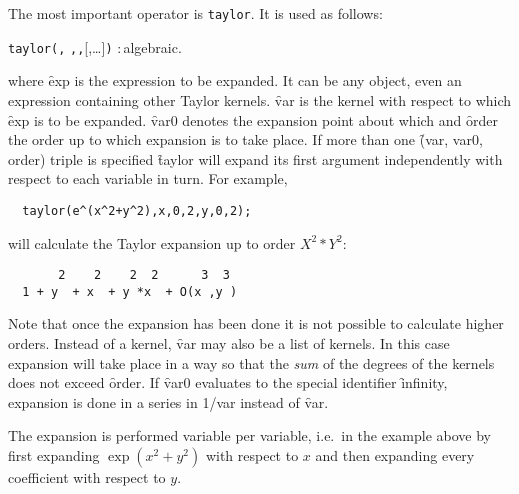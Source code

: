 

The most important operator is \texttt{taylor}.
It is used as follows:
\hypertarget{operator:TAYLOR}{}
\begin{syntax}
  \texttt{taylor(}\texttt{,}\newline
         \texttt{,}\texttt{,}[,\ldots]\texttt{)}
         :\,algebraic.
\end{syntax}
where \f{exp} is the expression to be expanded. It can be any \REDUCE{}
object, even an expression containing other Taylor kernels. \f{var} is
the kernel with respect to which \f{exp} is to be expanded. \f{var0}
denotes the expansion point about which and \f{order} the order up to which
expansion is to take place. If more than one \f{(var, var0, order)} triple
is specified \f{taylor} will expand its first argument independently
with respect to each variable in turn. For example,
\begin{verbatim}
  taylor(e^(x^2+y^2),x,0,2,y,0,2);
\end{verbatim}
will calculate the Taylor expansion up to order $X^{2}*Y^{2}$:
\begin{verbatim}
       2    2    2  2      3  3
  1 + y  + x  + y *x  + O(x ,y )
\end{verbatim}
Note that once the expansion has been done it is not possible to
calculate higher orders.
Instead of a kernel, \f{var} may also
be a list of kernels. In this case expansion will take place in a way
so that the \emph{sum} of the degrees of the kernels does not exceed
\f{order}.
If \f{var0} evaluates to the special identifier \f{infinity}, expansion is
done in a series in 1/var instead of \f{var}.

The expansion is performed variable per variable, i.e.\ in the example
above by first expanding $\exp(x^{2}+y^{2})$ with respect to $x$ and
then expanding every coefficient with respect to $y$.

